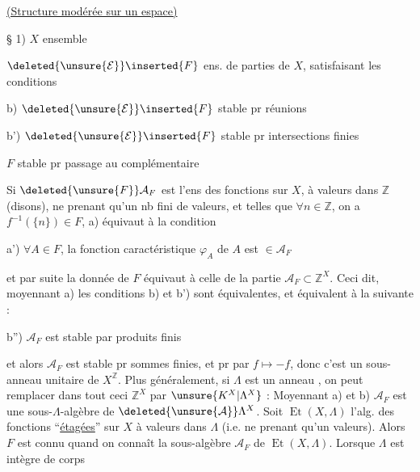 


\uline{(Structure modérée sur un espace)}

§ 1) $X$ ensemble 

$\deleted{\unsure{\mathcal E}}\inserted{F}$ ens. de parties de $X$, satisfaisant les conditions

b) $\deleted{\unsure{\mathcal E}}\inserted{F}$ stable pr réunions 

b') $\deleted{\unsure{\mathcal E}}\inserted{F}$ stable pr intersections finies

 $F$ stable pr passage au complémentaire


Si $\deleted{\unsure{F}}\mathcal A_F$ est l'ens des fonctions sur $X$, à valeurs dans $\mathbb{Z}$ (disons), ne prenant qu'un nb fini de valeurs, et telles que $\forall n\in \mathbb{Z}$, on a $f^{-1}(\{n\})\in F$,   a) équivaut à la condition


a') $\forall A\in F$, la fonction caractéristique $\varphi_A$ de $A$ est $\in\mathcal A_F$

et par suite  la donnée de $F$ équivaut à celle de la partie $\mathcal A_F\subset \mathbb{Z}^X$. Ceci dit,  moyennant a) les conditions b) et b') sont équivalentes, et équivalent à la suivante :

b'') $\mathcal A_F$ est stable par produits finis


et alors $\mathcal A_F$ est   stable pr sommes finies, et pr  par $f\mapsto-f$, donc c'est un sous-anneau unitaire de $X^\mathbb{Z}$. Plus généralement, si $\Lambda$ est un anneau  , on peut remplacer dans tout ceci  $\mathbb{Z}^X$ par $\unsure{K^X|\Lambda^X}$ : Moyennant a) et b) $\mathcal A_F$ est une sous-$\Lambda$-algèbre de $\deleted{\unsure{\mathcal A}}\Lambda^X$. Soit $\operatorname{Et}(X,\Lambda)$ l'alg. des fonctions ``\uline{étagées}'' sur $X$ à valeurs dans $\Lambda$ (i.e. ne prenant qu'un   valeurs). Alors $F$ est connu quand on connaît la sous-algèbre $\mathcal A_F$ de $\operatorname{Et}(X,\Lambda)$. Lorsque $\Lambda$ est intègre de corps

